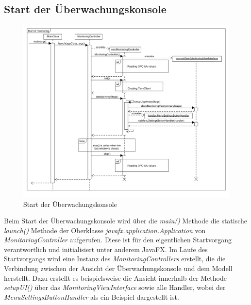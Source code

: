 \documentclass[parskip=full]{scrartcl}
\begin{document}
\subsection{Start der Überwachungskonsole}
\begin{figure}[H]
	\centering
	\includegraphics[scale=0.4]{design/sequence-diagrams/start-of-monitoring.png}
	\caption{Start der Überwachungskonsole}
\end{figure}
Beim Start der Überwachungskonsole wird über die \emph{main()} Methode die statische \emph{launch()} Methode der Oberklasse \emph{javafx.application.Application} von \emph{MonitoringController} aufgerufen. Diese ist für den eigentlichen Startvorgang verantwortlich und initialisiert unter anderem JavaFX.
Im Laufe des Startvorgangs wird eine Instanz des \emph{MonitoringControllers} erstellt, die die Verbindung zwischen der Ansicht der Überwachungskonsole und dem Modell herstellt. Dazu erstellt es beispielsweise die Ansicht innerhalb der Methode \emph{setupUI()} über das \emph{MonitoringViewInterface} sowie alle Handler, wobei der \emph{MenuSettingsButtonHandler} als ein Beispiel dargestellt ist.
\end{document}
